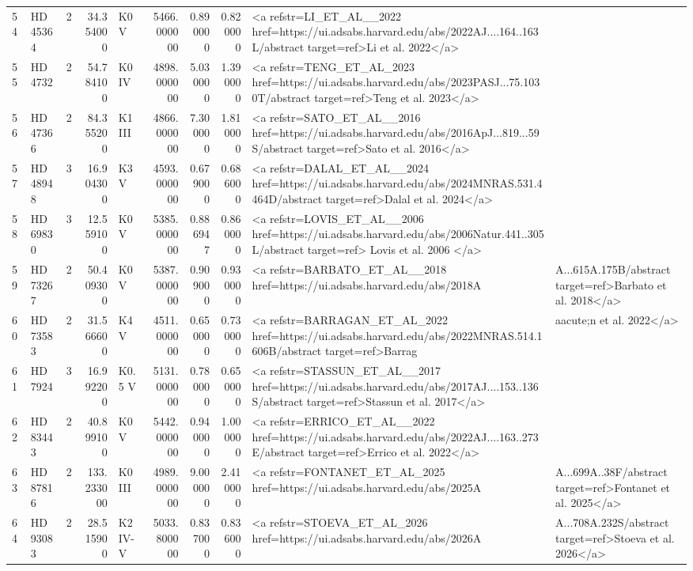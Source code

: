 \begin{tabular}{llrrlrrrl}
54 & HD 45364 & 2 & 34.354000 & K0 V & 5466.000000 & 0.890000 & 0.820000 & <a refstr=LI_ET_AL__2022 href=https://ui.adsabs.harvard.edu/abs/2022AJ....164..163L/abstract target=ref>Li et al. 2022</a> \\
55 & HD 4732 & 2 & 54.784100 & K0 IV & 4898.000000 & 5.030000 & 1.390000 & <a refstr=TENG_ET_AL_2023 href=https://ui.adsabs.harvard.edu/abs/2023PASJ...75.1030T/abstract target=ref>Teng et al. 2023</a> \\
56 & HD 47366 & 2 & 84.355200 & K1 III & 4866.000000 & 7.300000 & 1.810000 & <a refstr=SATO_ET_AL__2016 href=https://ui.adsabs.harvard.edu/abs/2016ApJ...819...59S/abstract target=ref>Sato et al. 2016</a> \\
57 & HD 48948 & 3 & 16.904300 & K3 V & 4593.000000 & 0.679000 & 0.686000 & <a refstr=DALAL_ET_AL__2024 href=https://ui.adsabs.harvard.edu/abs/2024MNRAS.531.4464D/abstract target=ref>Dalal et al. 2024</a> \\
58 & HD 69830 & 3 & 12.559100 & K0V & 5385.000000 & 0.886947 & 0.860000 & <a refstr=LOVIS_ET_AL__2006 href=https://ui.adsabs.harvard.edu/abs/2006Natur.441..305L/abstract target=ref> Lovis et al. 2006 </a> \\
59 & HD 73267 & 2 & 50.409300 & K0 V & 5387.000000 & 0.909000 & 0.930000 & <a refstr=BARBATO_ET_AL__2018 href=https://ui.adsabs.harvard.edu/abs/2018A&A...615A.175B/abstract target=ref>Barbato et al. 2018</a> \\
60 & HD 73583 & 2 & 31.566600 & K4 V & 4511.000000 & 0.650000 & 0.730000 & <a refstr=BARRAGAN_ET_AL_2022 href=https://ui.adsabs.harvard.edu/abs/2022MNRAS.514.1606B/abstract target=ref>Barrag&aacute;n et al. 2022</a> \\
61 & HD 7924 & 3 & 16.992200 & K0.5 V & 5131.000000 & 0.780000 & 0.650000 & <a refstr=STASSUN_ET_AL__2017 href=https://ui.adsabs.harvard.edu/abs/2017AJ....153..136S/abstract target=ref>Stassun et al. 2017</a> \\
62 & HD 83443 & 2 & 40.899100 & K0 V & 5442.000000 & 0.940000 & 1.000000 & <a refstr=ERRICO_ET_AL__2022 href=https://ui.adsabs.harvard.edu/abs/2022AJ....163..273E/abstract target=ref>Errico et al. 2022</a> \\
63 & HD 87816 & 2 & 133.233000 & K0 III & 4989.000000 & 9.000000 & 2.410000 & <a refstr=FONTANET_ET_AL_2025 href=https://ui.adsabs.harvard.edu/abs/2025A&A...699A..38F/abstract target=ref>Fontanet et al. 2025</a> \\
64 & HD 93083 & 2 & 28.515900 & K2 IV-V & 5033.800000 & 0.837000 & 0.836000 & <a refstr=STOEVA_ET_AL_2026 href=https://ui.adsabs.harvard.edu/abs/2026A&A...708A.232S/abstract target=ref>Stoeva et al. 2026</a> \\

\end{tabular}
